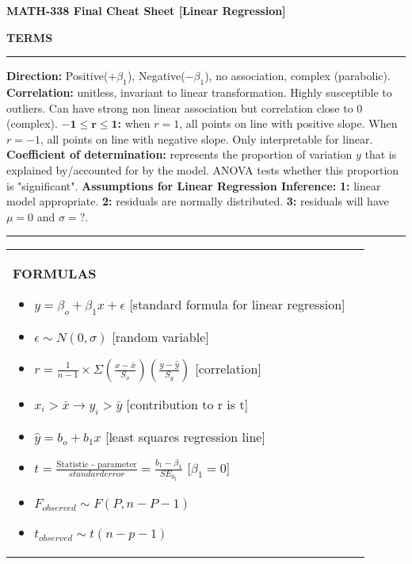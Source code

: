 \documentclass[6pt]{article}
\newcommand{\HL}{\par\noindent\rule{\textwidth}{0.4pt}}
\begin{document}
\begin{footnotesize}

\begin{center}
\textbf{MATH-338 Final Cheat Sheet [Linear Regression]}
\end{center}

\begin{flushleft}
\textbf{TERMS}
\end{flushleft}

\par\noindent\rule{\textwidth}{0.4pt}

\begin{flushleft}
\textbf{Direction:} Positive($+\beta_{1}$), Negative($-\beta_{1}$), no association, complex (parabolic).
\textbf{Correlation:} unitless, invariant to linear transformation. Highly susceptible to outliers. Can have strong non linear association but correlation close to 0 (complex).
\textbf{$\mathbf{-1 \le r \le 1}$:} when $r=1$, all points on line with positive slope. When $r=-1$, all points on line with negative slope. Only interpretable for linear.
\textbf{Coefficient of determination:} represents the proportion of variation $y$ that is explained by/accounted for by the model. ANOVA tests whether this proportion is "significant".
\textbf{Assumptions for Linear Regression Inference:} \textbf{1:} linear model appropriate. \textbf{2:} residuals are normally distributed. \textbf{3:} residuals will have $\mu = 0$ and $\sigma = ?$.
\end{flushleft}

\HL

\begin{tabular}{l | l}

\parbox{0.5\textwidth}{

\begin{flushleft}
\textbf{FORMULAS}
\end{flushleft}

\begin{itemize}

\item $y= \beta_{o} + \beta_{1}x + \epsilon$ [standard formula for linear regression]
\item $\epsilon \sim N(0, \sigma)$ [random variable]
\item $r = \frac{1}{n-1}\times \Sigma(\frac{x - \bar{x}}{S_{x}})(\frac{y - \bar{y}}{S_{y}})$ [correlation]
\item $x_{i} > \bar{x} \rightarrow y_{i} > \bar{y}$ [contribution to r is t]\
\item $\hat{y} = b_{o} + b_{1}x$ [least squares regression line]
\item $t = \frac{\text{Statistic - parameter}}{standard error} = \frac{b_{1} - \beta_{1}}{SE_{b_{1}}}$ [$\beta_{1} = 0$]
\item $F_{observed} \sim F(P, n-P-1)$
\item $t_{observed} \sim t(n-p-1)$
\end{itemize}

}
\end{tabular}
\end{footnotesize}
\end{document}
